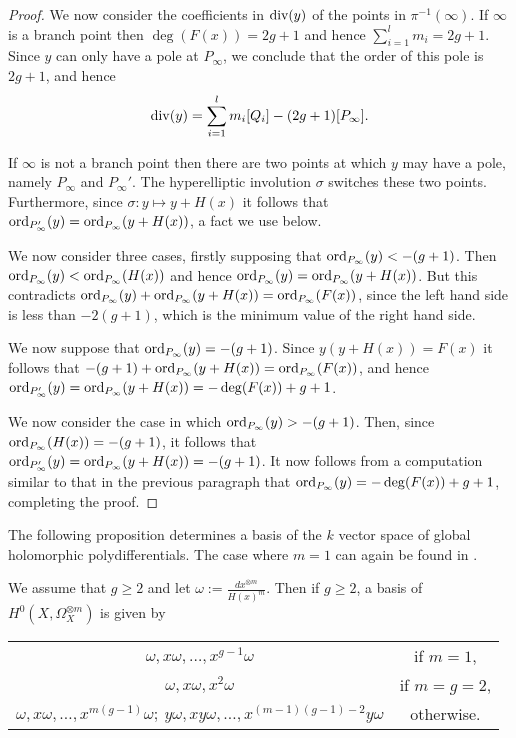 \begin{proof}
    We now consider the coefficients in $\operatorname{div}(y)$ of the points in $\pi^{-1}(\infty)$.
    If $\infty$ is a branch point then $\deg(F(x)) = 2g+1$ and hence $\sum_{i=1}^l m_i = 2g+1$.
    Since $y$ can only have a pole at $P_\infty$, we conclude that the order of this pole is $2g+1$, and hence
        \[
        \operatorname{div}(y) = \sum_{i=1}^l m_i [Q_i] - (2g+1)[P_\infty].
        \]
    
    If $\infty$ is not a branch point then there are two points at which $y$ may have a pole, namely $P_\infty$ and $P_\infty'$.
    The hyperelliptic involution $\sigma$ switches these two points.
    Furthermore, since $\sigma \colon y \mapsto y+H(x)$ it follows that $\operatorname{ord}_{P_\infty'}(y) = \operatorname{ord}_{P_ \infty}(y+H(x))$, a fact we use below.
    
    
    We now consider three cases, firstly supposing that $\operatorname{ord}_{P_\infty}(y) < -(g+1)$.
    Then $\operatorname{ord}_{P_\infty}(y) < \operatorname{ord}_{P_\infty}(H(x))$ and hence $ \operatorname{ord}_{P_\infty}(y) = \operatorname{ord}_{P_\infty}(y+H(x))$.
    But this contradicts $\operatorname{ord}_{P_\infty}(y) + \operatorname{ord}_{P_\infty}(y+H(x)) = \operatorname{ord}_{P_\infty}(F(x))$, since the left hand side is less than $-2(g+1)$, which is the minimum value of the right hand side.
    
    We now suppose that $\operatorname{ord}_{P_\infty} (y) = -(g+1)$. Since $y(y+H(x)) = F(x)$ it follows that $-(g+1) + \operatorname{ord}_{P_\infty}(y+H(x)) = \operatorname{ord}_{P_\infty}(F(x))$, and hence $\operatorname{ord}_{P_\infty'}(y) = \operatorname{ord}_{P_\infty}(y+H(x)) = -\deg(F(x)) + g + 1$.
    
    We now consider the case in which $\operatorname{ord}_{P_\infty}(y) > -(g+1)$.
    Then, since $\operatorname{ord}_{P_\infty}(H(x)) = -(g+1)$, it follows that $\operatorname{ord}_{P_\infty'}(y) = \operatorname{ord}_{P_\infty} (y+H(x)) = -(g+1)$.
    It now follows from a computation similar to that in the previous paragraph that $\operatorname{ord}_{P_\infty}(y) = -\deg(F(x)) + g +1$, completing the proof.
    \end{proof}

The following proposition determines a basis of the $k$ vector space of global holomorphic polydifferentials.
The case where $m=1$ can again be found in \cite[Prop. 7.4.26]{liu}.
    
    \begin{prop}\label{propbasishyperellipticp=2}
    We assume that $g\geq 2$ and let $\omega:= \frac{dx^{\otimes m}}{H(x)^m}$. 
    Then if $g\geq 2$, a basis of $H^0(X,\Omega_X^{\otimes m})$ is given by\par
        {\centering
        \begin{tabular}{c c}
        $\omega, x\omega, \ldots , x^{g-1}\omega$ &  if $m=1$, \\
        $\omega, x\omega, x^2\omega$ & if $m=g=2$, \\
        $\omega, x\omega, \ldots, x^{m(g-1)}\omega;\  y\omega, xy\omega, \ldots, x^{(m-1)(g-1)-2}y\omega$ & otherwise.
        \end{tabular}\par
        }
    \end{prop}


